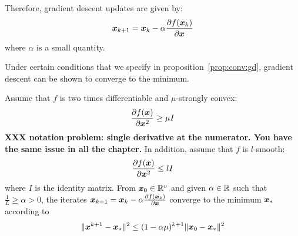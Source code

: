 Therefore, gradient descent updates are given by:
\begin{align}
  \xb_{k+1} = \xb_k -\alpha \partialfrac{\xb}{f(\xb_k)} \label{eq:update:gd}
\end{align}
where $\alpha$ is a small quantity.

Under certain conditions that we specify in proposition~\ref{prop:conv:gd},
gradient descent can be shown to converge to the minimum.

\begin{prop}
  \label{prop:conv:gd}
  Assume that $f$ is two times differentiable and $\mu$-strongly convex:
  \begin{equation}
    \partialfrac{\xb^2}{f(\xb)} \geq \mu I
  \end{equation}
  \textbf{XXX notation problem: single derivative at the numerator. You have the same issue in all the chapter.}
  In addition, assume that $f$ is $l$-smooth:
  \begin{equation}
    \partialfrac{\xb^2}{f(\xb)} \leq lI
  \end{equation}
  where $I$ is the identity matrix.
  From $\xb_0 \in \RR^v$ and given $\alpha \in \RR$ such that $\frac1{L} \geq \alpha > 0$, the iterates
  $\xb_{k+1} = \xb_k -\alpha \partialfrac{\xb}{f(\xb_k)}$ converge to the
  minimum $\xb_*$ according to
  \begin{equation}
    \| \xb^{k+1} - \xb_* \|^2 \leq (1 - \alpha \mu)^{k + 1} \| \xb_0 - \xb_* \|^2
  \end{equation}
\end{prop}
